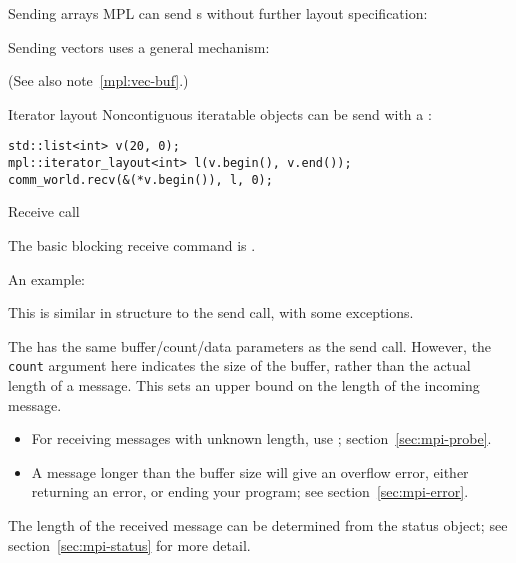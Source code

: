 \begin{mplnote}{Sending arrays}
  \ac{MPL} can send s
  without further layout specification:

  Sending vectors uses a general mechanism:
  
  (See also note~\ref{mpl:vec-buf}.)
\end{mplnote}

\begin{comment}
  \begin{mplnote}{Iterator buffers}
    It is possible to to send containers by iterators
    \cxxverbatimsnippet[examples/mpi/mpl/sendrange.cxx]{mplsendrange}
  \end{mplnote}
\end{comment}

\begin{mplnote}{Iterator layout}
  Noncontiguous iteratable objects can be send with a
  :
\begin{lstlisting}
std::list<int> v(20, 0);
mpl::iterator_layout<int> l(v.begin(), v.end());
comm_world.recv(&(*v.begin()), l, 0);  
\end{lstlisting}
\end{mplnote}

 {Receive call}

The basic blocking receive command is
.

An example:
%

This is similar in structure to the send call, with some exceptions.

The  has the same buffer/count/data parameters as the send
call.
However, 
the \lstinline{count} argument here indicates the size of the buffer,
rather than the actual length of a message.
This sets an upper bound on the length of the incoming message.
\begin{itemize}
\item For receiving messages with unknown length, use ;
  section~\ref{sec:mpi-probe}.
\item A message longer than the buffer size will give an overflow error,
  either returning an error, or ending your program; see section~\ref{sec:mpi-error}.
\end{itemize}
The length of the received message can be determined 
from the status object; see section~\ref{sec:mpi-status} for more detail.


